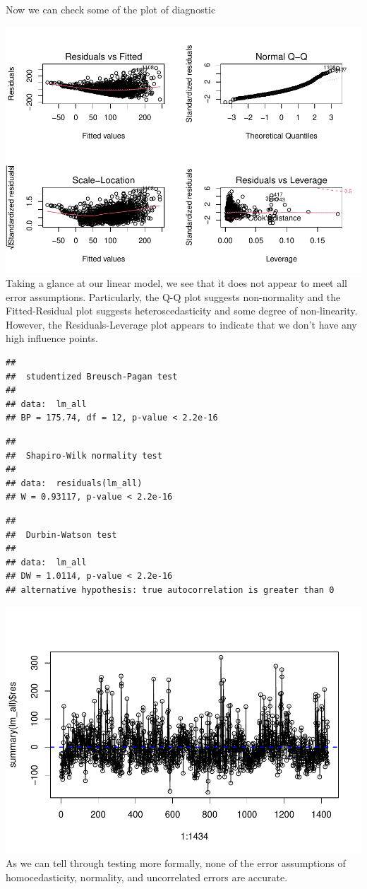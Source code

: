 \documentclass[
]{article}
\begin{document}
Now we can check some of the plot of diagnostic

\includegraphics{Final_Project_2_files/figure-latex/unnamed-chunk-12-1.pdf}
Taking a glance at our linear model, we see that it does not appear to
meet all error assumptions. Particularly, the Q-Q plot suggests
non-normality and the Fitted-Residual plot suggests heteroscedasticity
and some degree of non-linearity. However, the Residuals-Leverage plot
appears to indicate that we don't have any high influence points.

\begin{verbatim}
## 
##  studentized Breusch-Pagan test
## 
## data:  lm_all
## BP = 175.74, df = 12, p-value < 2.2e-16
\end{verbatim}

\begin{verbatim}
## 
##  Shapiro-Wilk normality test
## 
## data:  residuals(lm_all)
## W = 0.93117, p-value < 2.2e-16
\end{verbatim}

\begin{verbatim}
## 
##  Durbin-Watson test
## 
## data:  lm_all
## DW = 1.0114, p-value < 2.2e-16
## alternative hypothesis: true autocorrelation is greater than 0
\end{verbatim}

\includegraphics{Final_Project_2_files/figure-latex/unnamed-chunk-13-1.pdf}
As we can tell through testing more formally, none of the error
assumptions of homocedasticity, normality, and uncorrelated errors are
accurate.
\end{document}
